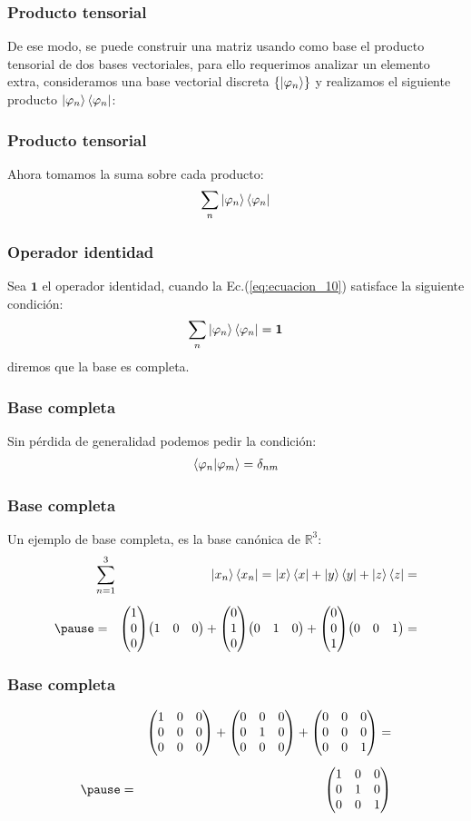 \documentclass[12pt]{beamer}
\begin{document}
\begin{frame}
\frametitle{Producto tensorial}
De ese modo, se puede construir una matriz usando como base el producto tensorial de dos bases vectoriales, para ello requerimos analizar un elemento extra, consideramos una base vectorial discreta $\left\{ \ket{\varphi_{n}} \right\} $ y realizamos el siguiente producto $\ket{\varphi_{n}} \bra{\varphi_{n}}$:
\end{frame}
\begin{frame}
\frametitle{Producto tensorial}
Ahora tomamos la suma sobre cada producto:
\begin{align}
\sum_{n} \ket{\varphi_{n}} \bra{\varphi_{n}}
\label{eq:ecuacion_10}
\end{align}
\end{frame}
\begin{frame}
\frametitle{Operador identidad}
Sea $\mathbf{1}$ el operador identidad, cuando la Ec.(\ref{eq:ecuacion_10}) satisface la siguiente condición:
\begin{align}
\sum_{n} \ket{\varphi_{n}} \bra{\varphi_{n}} = \mathbf{1}
\label{eq:ecuacion_11}
\end{align}
diremos que la base es completa.
\end{frame}
\begin{frame}
\frametitle{Base completa}
Sin pérdida de generalidad podemos pedir la condición:
\begin{align*}
\braket{\varphi_{n}}{\varphi_{m}} = \delta_{nm}
\end{align*}
\end{frame}
\begin{frame}
\frametitle{Base completa}
Un ejemplo de base completa, es la base canónica de $\mathbb{R}^{3}$:
\fontsize{12}{12}\selectfont
\begin{eqnarray*}
&\sum_{n=1}^{3}& \ket{x_{n}} \bra{x_{n}} = \ket{x} \bra{x} + \ket{y} \bra{y} + \ket{z} \bra{z} = \\[0.5em] \pause
&=& \! \! \! \! \mqty(1 \\ 0 \\ 0) \mqty(1 & 0 & 0) + \mqty(0 \\ 1 \\ 0) \mqty(0 & 1 & 0) + \mqty(0 \\ 0 \\ 1) \mqty(0 & 0 & 1) =
\end{eqnarray*}
\end{frame}
\begin{frame}
\frametitle{Base completa}
\fontsize{12}{12}\selectfont
\begin{eqnarray*}
&{}&\mqty(
1 & 0 & 0 \\
0 & 0 & 0 \\
0 & 0 & 0
) +
\mqty(
0 & 0 & 0 \\
0 & 1 & 0 \\
0 & 0 & 0
) + 
\mqty(
0 & 0 & 0 \\
0 & 0 & 0 \\
0 & 0 & 1
) = \\[0.5em] \pause
&=& \mqty(
1 & 0 & 0 \\
0 & 1 & 0 \\
0 & 0 & 1
)  
\end{eqnarray*}
\end{frame}
\end{document}
